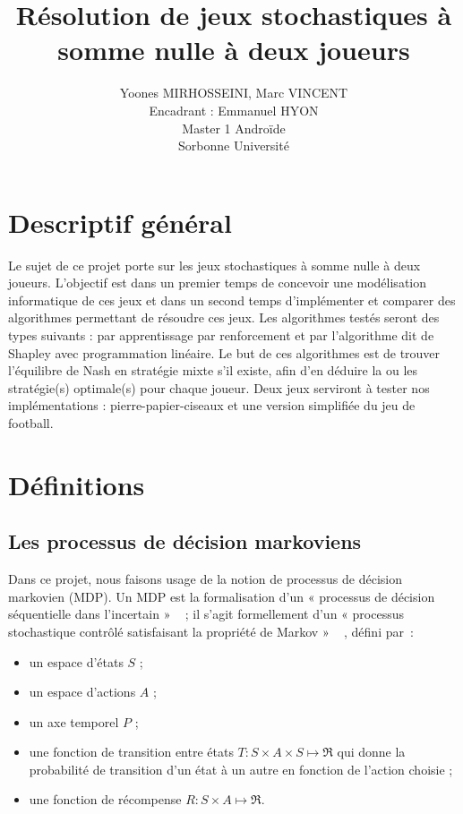 \documentclass{article}
\title{Résolution de jeux stochastiques à somme nulle à deux joueurs}
\author{Yoones MIRHOSSEINI, Marc VINCENT\\
				Encadrant : Emmanuel HYON\\
                Master 1 Androïde\\
                Sorbonne Université\\}
\begin{document}
\maketitle
\tableofcontents 

\section{Descriptif général}
Le sujet de ce projet porte sur les jeux stochastiques à somme nulle à deux joueurs. L’objectif est dans un premier temps de concevoir une modélisation informatique de ces jeux et dans un second temps d’implémenter et comparer des algorithmes permettant de résoudre ces jeux. Les algorithmes testés seront des types suivants : par apprentissage par renforcement et par l’algorithme dit de Shapley avec programmation linéaire. Le but de ces algorithmes est de trouver l’équilibre de Nash en stratégie mixte s’il existe, afin d’en déduire la ou les stratégie(s) optimale(s) pour chaque joueur. Deux jeux serviront à tester nos implémentations : pierre-papier-ciseaux et une version simplifiée du jeu de football.


\section{Définitions}

\subsection{Les processus de décision markoviens}

Dans ce projet, nous faisons usage de la notion de processus de décision markovien (MDP). Un MDP est la formalisation d’un « processus de décision séquentielle dans l’incertain » ~\cite{pdmia}  ; il s’agit formellement d’un « processus stochastique contrôlé satisfaisant la propriété de Markov » ~\cite{pdmia} , défini par~:

\begin{itemize}
\item un espace d’états \(S\) ;
\item un espace d’actions \(A\) ;
\item un axe temporel \(P\) ;
\item une fonction de transition entre états \(T : S \times A \times S \mapsto \Re\) qui donne la probabilité de transition d'un état à un autre en fonction de l'action choisie ;
\item une fonction de récompense \(R : S \times A \mapsto \Re\).
\end{itemize}
\end{document}
